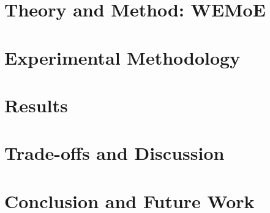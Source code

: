 \documentclass[a4paper,11pt]{report}
\begin{document}
\chapter{Theory and Method: WEMoE}
\label{ch:theory}


\chapter{Experimental Methodology}
\label{ch:method}


\chapter{Results}
\label{ch:results}


\chapter{Trade-offs and Discussion}
\label{ch:discussion}


\chapter{Conclusion and Future Work}
\label{ch:conclusion}


\clearpage
{}
{}


\end{document}
